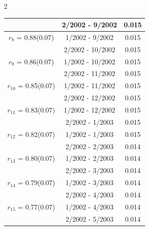 \begin{multicols}{2}
{\begin{tabular}{ccc}
&        2/2002 -  9/2002 &        0.015  \vspace{-.02in} \\ \hline 
  $r_{ 8}$ = 0.88(0.07) &       1/2002 -  9/2002 &        0.015   \vspace{-.10in} \\  
&        2/2002 - 10/2002 &        0.015  \vspace{-.02in} \\ \hline 
  $r_{ 9}$ = 0.86(0.07) &       1/2002 - 10/2002 &        0.015   \vspace{-.10in} \\  
&        2/2002 - 11/2002 &        0.015  \vspace{-.02in} \\ \hline 
  $r_{10}$ = 0.85(0.07) &       1/2002 - 11/2002 &        0.015   \vspace{-.10in} \\  
&        2/2002 - 12/2002 &        0.015  \vspace{-.02in} \\ \hline 
  $r_{11}$ = 0.83(0.07) &       1/2002 - 12/2002 &        0.015   \vspace{-.10in} \\  
&        2/2002 -  1/2003 &        0.015  \vspace{-.02in} \\ \hline 
  $r_{12}$ = 0.82(0.07) &       1/2002 -  1/2003 &        0.015   \vspace{-.10in} \\  
&        2/2002 -  2/2003 &        0.014  \vspace{-.02in} \\ \hline 
  $r_{13}$ = 0.80(0.07) &       1/2002 -  2/2003 &        0.014   \vspace{-.10in} \\  
&        2/2002 -  3/2003 &        0.014  \vspace{-.02in} \\ \hline 
  $r_{14}$ = 0.79(0.07) &       1/2002 -  3/2003 &        0.014   \vspace{-.10in} \\  
&        2/2002 -  4/2003 &        0.014  \vspace{-.02in} \\ \hline 
  $r_{15}$ = 0.77(0.07) &       1/2002 -  4/2003 &        0.014   \vspace{-.10in} \\  
&        2/2002 -  5/2003 &        0.014  \vspace{-.02in} \\ \hline 

\end{tabular}}
\end{multicols}
